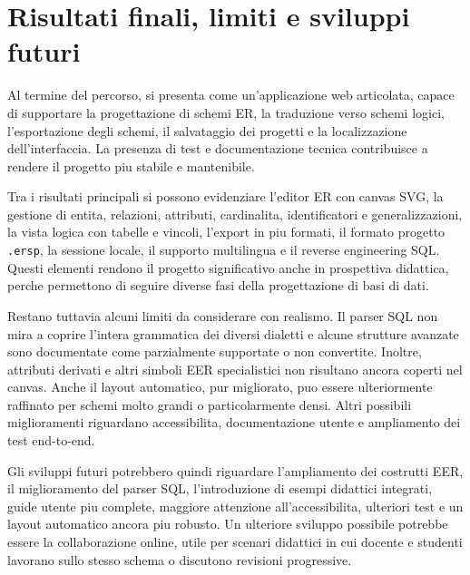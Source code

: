 \section{Risultati finali, limiti e sviluppi futuri}

Al termine del percorso, \builder{} si presenta come un'applicazione web articolata, capace di supportare la progettazione di schemi ER, la traduzione verso schemi logici, l'esportazione degli schemi, il salvataggio dei progetti e la localizzazione dell'interfaccia. La presenza di test e documentazione tecnica contribuisce a rendere il progetto piu stabile e mantenibile.

Tra i risultati principali si possono evidenziare l'editor ER con canvas SVG, la gestione di entita, relazioni, attributi, cardinalita, identificatori e generalizzazioni, la vista logica con tabelle e vincoli, l'export in piu formati, il formato progetto \texttt{.ersp}, la sessione locale, il supporto multilingua e il reverse engineering SQL. Questi elementi rendono il progetto significativo anche in prospettiva didattica, perche permettono di seguire diverse fasi della progettazione di basi di dati.

Restano tuttavia alcuni limiti da considerare con realismo. Il parser SQL non mira a coprire l'intera grammatica dei diversi dialetti e alcune strutture avanzate sono documentate come parzialmente supportate o non convertite. Inoltre, attributi derivati e altri simboli EER specialistici non risultano ancora coperti nel canvas. Anche il layout automatico, pur migliorato, puo essere ulteriormente raffinato per schemi molto grandi o particolarmente densi. Altri possibili miglioramenti riguardano accessibilita, documentazione utente e ampliamento dei test end-to-end.

Gli sviluppi futuri potrebbero quindi riguardare l'ampliamento dei costrutti EER, il miglioramento del parser SQL, l'introduzione di esempi didattici integrati, guide utente piu complete, maggiore attenzione all'accessibilita, ulteriori test e un layout automatico ancora piu robusto. Un ulteriore sviluppo possibile potrebbe essere la collaborazione online, utile per scenari didattici in cui docente e studenti lavorano sullo stesso schema o discutono revisioni progressive.
